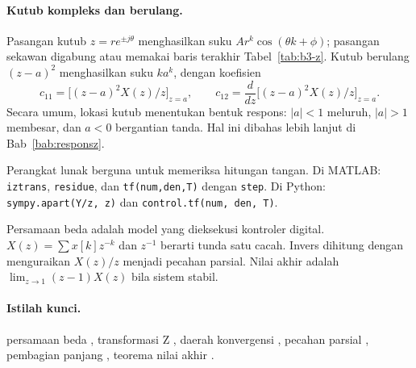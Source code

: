 \paragraph{Kutub kompleks dan berulang.} Pasangan kutub $z = re^{\pm j\theta}$ menghasilkan suku $Ar^k\cos(\theta k + \phi)$; pasangan sekawan digabung atau memakai baris terakhir Tabel~\ref{tab:b3-z}. Kutub berulang $(z-a)^2$ menghasilkan suku $ka^k$, dengan koefisien
\[
	c_{11} = \big[(z-a)^2X(z)/z\big]_{z=a},\qquad c_{12} = \frac{d}{dz}\big[(z-a)^2X(z)/z\big]_{z=a}.
\]
Secara umum, lokasi kutub menentukan bentuk respons: $|a| < 1$ meluruh, $|a| > 1$ membesar, dan $a < 0$ bergantian tanda. Hal ini dibahas lebih lanjut di Bab~\ref{bab:responsz}.

\begin{catatan}
	Perangkat lunak berguna untuk memeriksa hitungan tangan. Di MATLAB: \texttt{iztrans}, \texttt{residue}, dan \texttt{tf(num,den,T)} dengan \texttt{step}. Di Python: \texttt{sympy.apart(Y/z, z)} dan \texttt{control.tf(num, den, T)}.
\end{catatan}

\begin{ringkasan}
	Persamaan beda adalah model yang dieksekusi kontroler digital. $X(z) = \sum x[k]z^{-k}$ dan $z^{-1}$ berarti tunda satu cacah. Invers dihitung dengan menguraikan $X(z)/z$ menjadi pecahan parsial. Nilai akhir adalah $\lim_{z\to1}(z-1)X(z)$ bila sistem stabil.\\[3pt]
\end{ringkasan}

\paragraph{Istilah kunci.} persamaan beda , transformasi Z , daerah konvergensi , pecahan parsial , pembagian panjang , teorema nilai akhir .

